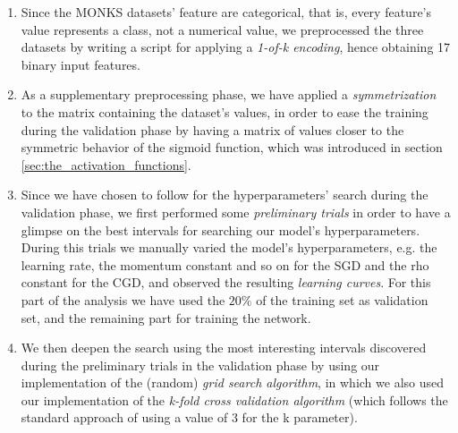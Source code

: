         \begin{enumerate}
            \item Since the MONKS datasets’ feature are categorical, that is, every feature’s value represents
            a class, not a numerical value, we preprocessed the three datasets by writing a script
            for applying a \textit{1-of-k encoding}, hence obtaining 17 binary input features.
            \item As a supplementary preprocessing phase, we have applied a \textit{symmetrization} to the
            matrix containing the dataset’s values, in order to ease the training during the validation phase
            by having a matrix of values closer to the symmetric behavior of the sigmoid function, which was
            introduced in section \ref{sec:the_activation_functions}.
            \item Since we have chosen to follow \cite{Bergstra:2012:RSH:2188385.2188395} for the
            hyperparameters' search during the validation phase, we first performed some
            \textit{preliminary trials} in order to have a glimpse on the best intervals for searching our
            model's hyperparameters. During this trials we manually varied the model's hyperparameters, e.g.
            the learning rate, the momentum constant and so on for the SGD and the rho constant for the CGD,
            and observed the resulting \textit{learning curves}. For this part of the analysis we have used
            the $20\%$ of the training set as validation set, and the remaining part for training the network.
            \item We then deepen the search using the most interesting intervals discovered during the
            preliminary trials in the validation phase by using our implementation of the (random)
            \textit{grid search algorithm}, in which we also used our implementation of the
            \textit{k-fold cross validation algorithm} (which follows the standard approach of using a value
            of 3 for the k parameter).
        \end{enumerate}

